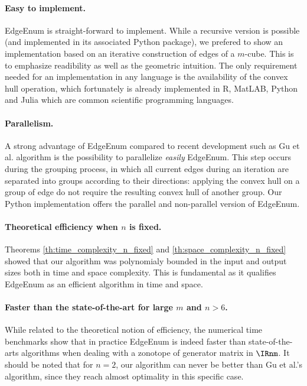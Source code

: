 \paragraph*{Easy to implement.} EdgeEnum is straight-forward to implement.
While a recursive version is possible (and implemented in its associated Python package), we prefered to show an implementation based on an iterative construction of edges of a $m$-cube. This is to emphasize readibility as well as the geometric intuition. The only requirement needed for an implementation in any language is the availability of the convex hull operation, which fortunately is already implemented in R, MatLAB, Python and Julia which are common scientific programming languages.

\paragraph*{Parallelism.} A strong advantage of EdgeEnum compared to recent development such as Gu et al. \cite{guCounterfactualIdentificationLatent2022} algorithm is the possibility to parallelize \emph{easily} EdgeEnum. This step occurs during the grouping process, in which all current edges during an iteration are separated into groups according to their directions: applying the convex hull on a group of edge do not require the resulting convex hull of another group. Our Python implementation offers the parallel and non-parallel version of EdgeEnum.

\paragraph*{Theoretical efficiency when $n$ is fixed.} Theorems \ref{th:time_complexity_n_fixed} and \ref{th:space_complexity_n_fixed} showed that our algorithm was polynomialy bounded in the input and output sizes both in time and space complexity. This is fundamental as it qualifies EdgeEnum as an efficient algorithm in time and space. 

\paragraph*{Faster than the state-of-the-art for large $m$ and $n>6$.} While related to the theoretical notion of efficiency, the numerical time benchmarks show that in practice EdgeEnum is indeed faster than state-of-the-arts algorithms when dealing with a zonotope of generator matrix in $\IRnm$. It should be noted that for $n=2$, our algorithm can never be better than Gu et al.'s algorithm, since they reach almost optimality in this specific case.

